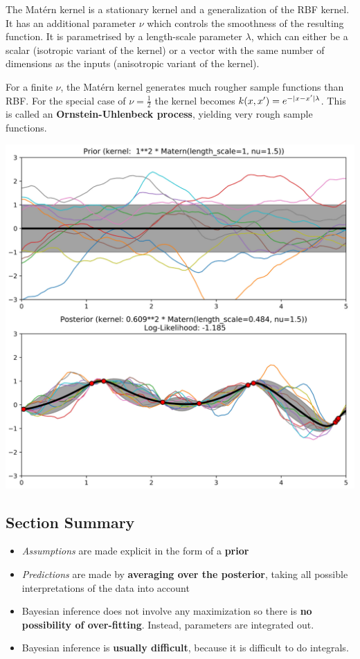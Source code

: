 \documentclass[11pt]{article}
\theoremstyle{definition}
\DeclarePairedDelimiter\abs{\lvert}{\rvert}
\begin{document}
\noindent
\begin{minipage}{0.55\linewidth}
	The Matérn kernel is a stationary kernel and a generalization of the RBF kernel. It has an additional parameter $\nu$ which controls the smoothness of the resulting function. It is parametrised by a length-scale parameter $\lambda$, which can either be a scalar (isotropic variant of the kernel) or a vector with the same number of dimensions as the inputs (anisotropic variant of the kernel). 
	
	For a finite $\nu$, the Matérn kernel generates much rougher sample functions than RBF. For the special case of $\nu = \frac{1}{2}$ the kernel becomes $ k(x,x') = e^{-\abs{x-x'}\lambda}$. This is called an \textbf{Ornstein-Uhlenbeck process}, yielding very rough sample functions.
\end{minipage}
\hfill
\begin{minipage}{0.42\linewidth}
		\includegraphics[width=\linewidth]{img/matern_kernel}
\end{minipage}

\subsection{Section Summary}
\begin{itemize}
	\item \emph{Assumptions} are made explicit in the form of a \textbf{prior}
	\item \emph{Predictions} are made by \textbf{averaging over the posterior}, taking all possible interpretations of the data into account
	\item Bayesian inference does not involve any maximization so there is \textbf{no possibility of over-fitting}. Instead, parameters are integrated out.
	\item Bayesian inference is \textbf{usually difficult}, because it is difficult to do integrals.
\end{itemize}
\end{document}
